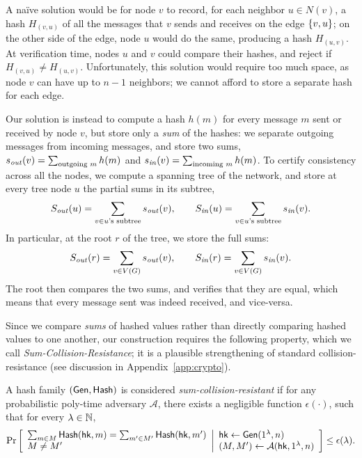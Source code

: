 A na\"ive solution would be for node $v$ to record, for each neighbor $u \in N(v)$,
a hash $H_{(v,u)}$ of all the messages that $v$ sends and receives on the edge $\left \{{v,u} \right \}$;
on the other side of the edge, node $u$ would do the same, producing a hash $H_{(u,v)}$.
At verification time, nodes $u$ and $v$ could compare their hashes, and reject if $H_{(v,u)} \neq H_{(u,v)}$.
Unfortunately, this solution would require too much space,
as node $v$ can have up to $n - 1$ neighbors;
we cannot afford to store a separate hash for each edge.

Our solution is instead to compute a hash $h(m)$
for every message $m$ sent or received by node $v$,
but store only a \emph{sum} of the hashes:
we separate outgoing messages from incoming messages,
and store two sums,
$s_{\mathit{ out }}(v) = \sum_{\text{outgoing $m$}} h(m)$
and
$s_{\mathit{ in }}(v) = \sum_{\text{incoming $m$}} h(m)$.
To certify consistency across all the nodes,
we compute a spanning tree of the network,
and store at every tree node $u$ the partial sums
in its subtree,
\begin{equation*}
	S_{\mathit{ out }}(u) = \sum_{v \in \text{$u$'s subtree}} s_{\mathit{ out }}(v),
	\qquad
	S_{\mathit{ in }}(u) = \sum_{v \in \text{$u$'s subtree}} s_{\mathit{ in }}(v).
\end{equation*}
In particular, at the root $r$ of the tree, we store the full sums:
\begin{equation*}
	S_{\mathit{ out }}(r) = \sum_{v \in V(G)} s_{\mathit{ out }}(v),
	\qquad
	S_{\mathit{ in }}(r) = \sum_{v \in V(G)} s_{\mathit{ in }}(v).
\end{equation*}
The root then compares the two sums, and verifies that they are equal,
which means that every message sent was indeed received, and vice-versa.


Since we compare \emph{sums} of hashed values rather than
directly comparing hashed values to one another,
our construction requires the following property,
which we call \emph{Sum-Collision-Resistance};
it is a plausible strengthening of standard collision-resistance (see discussion in Appendix~\ref{app:crypto}). 

\begin{definition} 
    A hash family $(\mathsf{Gen}, \mathsf{Hash})$ is considered \emph{sum-collision-resistant} if for any probabilistic poly-time adversary $\mathcal{A}$, there exists a negligible function $\epsilon(\cdot)$, such that for every $\lambda\in \mathbb{N}$,  
    \begin{gather*}
        \Pr \left[ \begin{array}{ll} 
		\sum_{ m \in M }\mathsf{Hash}(\mathsf{hk}, m) = \sum_{ m' \in M'}\mathsf{Hash}(\mathsf{hk}, m')\\
		M \neq M'
	 \end{array} \middle\vert \begin{array}{ll} 
		\mathsf{hk} \leftarrow \mathsf{Gen}(1^\lambda, n) \\
		(M, M') \leftarrow\mathcal{A}(\mathsf{hk}, 1^\lambda, n)
         \end{array} \right]
	\leq \epsilon(\lambda)
	.
    \end{gather*}
\end{definition}

